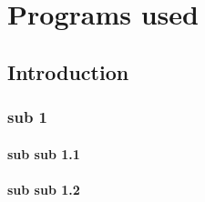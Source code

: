 \chapter{Programs used}
\section{Introduction}
\subsection{sub 1}
\subsubsection{sub sub 1.1}
\subsubsection{sub sub 1.2}